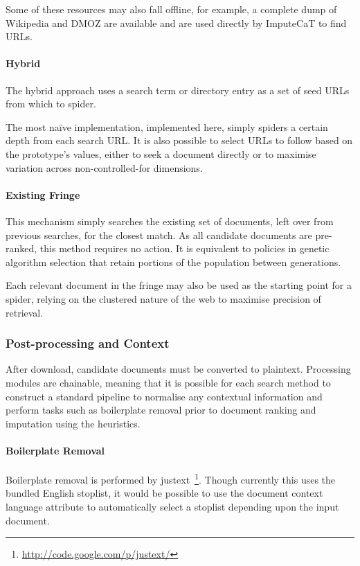 Some of these resources may also fall offline, for example, a complete dump of Wikipedia and DMOZ are available and are used directly by ImputeCaT to find URLs.


\paragraph{Hybrid}
The hybrid approach uses a search term or directory entry as a set of seed URLs from which to spider.

The most na\"ive implementation, implemented here, simply spiders a certain depth from each search URL.  It is also possible to select URLs to follow based on the prototype's values, either to seek a document directly or to maximise variation across non-controlled-for dimensions.






\paragraph{Existing Fringe}
This mechanism simply searches the existing set of documents, left over from previous searches, for the closest match.  As all candidate documents are pre-ranked, this method requires no action.  It is equivalent to policies in genetic algorithm selection that retain portions of the population between generations.

Each relevant document in the fringe may also be used as the starting point for a spider, relying on the clustered nature of the web to maximise precision of retrieval.  


\subsubsection{Post-processing and Context}
After download, candidate documents must be converted to plaintext.  Processing modules are chainable, meaning that it is possible for each search method to construct a standard pipeline to normalise any contextual information and perform tasks such as boilerplate removal prior to document ranking and imputation using the heuristics.

\paragraph{Boilerplate Removal}
Boilerplate removal is performed by justext~\footnote{\url{http://code.google.com/p/justext/}}.  Though currently this uses the bundled English stoplist, it would be possible to use the document context language attribute to automatically select a stoplist depending upon the input document.




